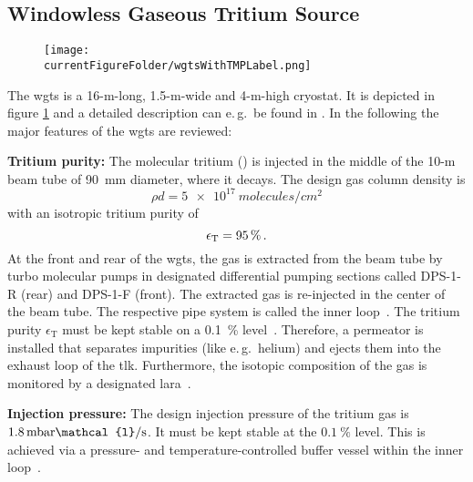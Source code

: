 \subsection{Windowless Gaseous Tritium Source}
\label{sec:katrinExpSetupWGTS}
\begin{figure}
    \centering    \texttt{[image: \\currentFigureFolder/wgtsWithTMPLabel.png]}
    \label{fig:katrinExpSetupWGTS}
\end{figure}%
The \gls{wgts} is a 16-m-long, 1.5-m-wide and 4-m-high cryostat. It is depicted in figure \ref{fig:katrinExpSetupWGTS} and a detailed description can e.\,g.~be found in \cite{Grohman2008}. In the following the major features of the \gls{wgts} are reviewed:

{\par\textbf{Tritium purity:} 
The molecular tritium () is injected in the middle of the 10-m beam tube of \SI{90}{mm} diameter, where it decays. The design gas column density is 
\begin{equation}
    \label{eq:columnDensity}
    \rho d = \SI{5e17}{molecules/{cm}^2}
\end{equation}
with an isotropic tritium purity of
\begin{equation}
    \epsilon_\text{T} = \SI{95}{\percent}
    \text{\,.}
\end{equation}
At the front and rear of the \gls{wgts}, the gas is extracted from the beam tube by turbo molecular pumps in designated differential pumping sections called DPS-1-R (rear) and DPS-1-F (front). The extracted gas is re-injected in the center of the beam tube. The respective pipe system is called the inner loop~\cite{PRIESTER201542}. The tritium purity $\epsilon_\text{T}$ must be kept stable on a \SI{0.1}{\percent} level~\cite{Angrik:2005ep}. Therefore, a permeator is installed that separates impurities (like e.\,g.~helium) and ejects them into the exhaust loop of the \gls{tlk}. Furthermore, the isotopic composition of the gas
is monitored by a designated \gls{lara}~\cite{Schloesser2013}.}

{\par\textbf{Injection pressure:}
The design injection pressure of the tritium gas is $1.8\text{\,mbar}\mathcal{l}/\text{s}$. It must be kept stable at the $\SI{0.1}{\percent}$ level. This is achieved via a pressure- and temperature-controlled buffer vessel within the inner loop~\cite{PRIESTER201542}.}

